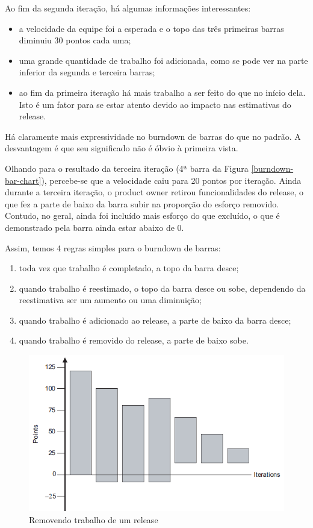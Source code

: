 \documentclass[a4paper,abntfigtabnum,noindentfirst]{abnt}
\begin{document}
Ao fim da segunda iteração, há algumas informações interessantes:
\begin{itemize}
 \item a velocidade da equipe foi a esperada e o topo das três primeiras barras diminuiu 30 pontos cada uma;
 \item uma grande quantidade de trabalho foi adicionada, como se pode ver na parte inferior da segunda e terceira barras;
 \item ao fim da primeira iteração há mais trabalho a ser feito do que no início dela. Isto é um fator para se estar atento devido ao impacto nas estimativas do release.
\end{itemize}

Há claramente mais expressividade no burndown de barras do que no padrão. A desvantagem é que seu significado não é óbvio à primeira vista.

Olhando para o resultado da terceira iteração (4ª barra da Figura \ref{burndown-bar-chart}), percebe-se que a velocidade caiu para 20 pontos por iteração. Ainda durante a terceira iteração, o product owner retirou funcionalidades do release, o que fez a parte de baixo da barra subir na proporção do esforço removido. Contudo, no geral, ainda foi incluído mais esforço do que excluído, o que é demonstrado pela barra ainda estar abaixo de 0.

Assim, temos 4 regras simples para o burndown de barras:
\begin{enumerate}
 \item toda vez que trabalho é completado, a topo da barra desce;
 \item quando trabalho é reestimado, o topo da barra desce ou sobe, dependendo da reestimativa ser um aumento ou uma diminuição;
 \item quando trabalho é adicionado ao release, a parte de baixo da barra desce;
 \item quando trabalho é removido do release, a parte de baixo sobe.
\end{enumerate}

\begin{figure}
  \caption{Removendo trabalho de um release}
  \label{burndown-bar-chart-real}
  \begin{center}
  \includegraphics[scale=0.6]{burndown-bar-chart-real}
  \end{center}
\end{figure}
\end{document}
